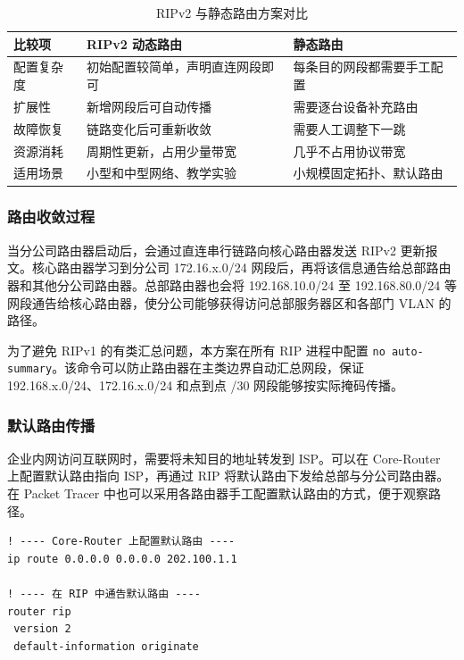 \documentclass[12pt,a4paper]{ctexart}
\begin{document}
\begin{table}[H]
\centering
\caption{RIPv2 与静态路由方案对比}
\label{tab:rip-static}
\begin{tabular}{|p{3cm}|p{5cm}|p{5cm}|}
\hline
\textbf{比较项} & \textbf{RIPv2 动态路由} & \textbf{静态路由} \\ \hline
配置复杂度 & 初始配置较简单，声明直连网段即可 & 每条目的网段都需要手工配置 \\ \hline
扩展性 & 新增网段后可自动传播 & 需要逐台设备补充路由 \\ \hline
故障恢复 & 链路变化后可重新收敛 & 需要人工调整下一跳 \\ \hline
资源消耗 & 周期性更新，占用少量带宽 & 几乎不占用协议带宽 \\ \hline
适用场景 & 小型和中型网络、教学实验 & 小规模固定拓扑、默认路由 \\ \hline
\end{tabular}
\end{table}

\subsubsection{路由收敛过程}

当分公司路由器启动后，会通过直连串行链路向核心路由器发送 RIPv2 更新报文。核心路由器学习到分公司 172.16.x.0/24 网段后，再将该信息通告给总部路由器和其他分公司路由器。总部路由器也会将 192.168.10.0/24 至 192.168.80.0/24 等网段通告给核心路由器，使分公司能够获得访问总部服务器区和各部门 VLAN 的路径。

为了避免 RIPv1 的有类汇总问题，本方案在所有 RIP 进程中配置 \texttt{no auto-summary}。该命令可以防止路由器在主类边界自动汇总网段，保证 192.168.x.0/24、172.16.x.0/24 和点到点 /30 网段能够按实际掩码传播。

\subsubsection{默认路由传播}

企业内网访问互联网时，需要将未知目的地址转发到 ISP。可以在 Core-Router 上配置默认路由指向 ISP，再通过 RIP 将默认路由下发给总部与分公司路由器。在 Packet Tracer 中也可以采用各路由器手工配置默认路由的方式，便于观察路径。

\begin{lstlisting}[caption={默认路由与 RIP 默认路由传播示意}, label={lst:default-route}]
! ---- Core-Router 上配置默认路由 ----
ip route 0.0.0.0 0.0.0.0 202.100.1.1

! ---- 在 RIP 中通告默认路由 ----
router rip
 version 2
 default-information originate
\end{lstlisting}
\end{document}

